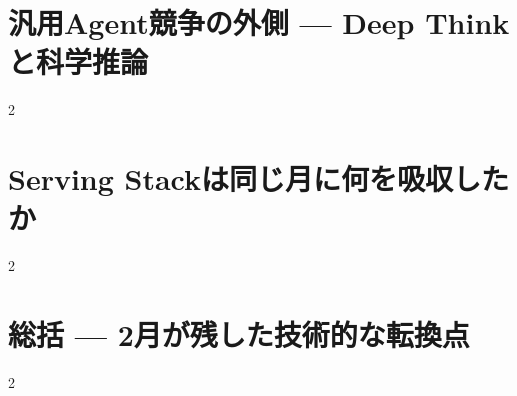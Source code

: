 \documentclass[lualatex,a4paper,11pt]{jlreq}
\begin{document}
\section{汎用Agent競争の外側 — Deep Thinkと科学推論}
\label{pkg:specialized-reasoning-science}
\vspace{0.15em}

\vspace{0.20em}
\begin{multicols}{2}

\end{multicols}

\medskip


\Needspace{0.45\textheight}
\bigskip
\section{Serving Stackは同じ月に何を吸収したか}
\label{pkg:serving-stack-catches-up}
\vspace{0.15em}

\vspace{0.20em}
\begin{multicols}{2}

\end{multicols}

\medskip


\Needspace{0.45\textheight}
\bigskip
\section{総括 — 2月が残した技術的な転換点}
\label{pkg:closing-synthesis}
\vspace{0.15em}

\vspace{0.20em}
\begin{multicols}{2}

\end{multicols}

\medskip


\Needspace{0.30\textheight}
\bigskip
\printbibliography[title={References / Source Notes}]
\end{document}
